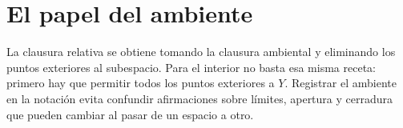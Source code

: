 \section{El papel del ambiente}
La clausura relativa se obtiene tomando la clausura ambiental y eliminando los puntos exteriores al subespacio. Para el interior no basta esa misma receta: primero hay que permitir todos los puntos exteriores a $Y$. Registrar el ambiente en la notación evita confundir afirmaciones sobre límites, apertura y cerradura que pueden cambiar al pasar de un espacio a otro.
